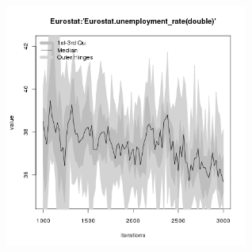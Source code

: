 \begin{figure}[ht!]
\begin{minipage}{17cm}
\includegraphics[width=8cm]{./energy_shock/png/duration_240/intensity_0.01/frequency_20/Eurostat-unemployment_rate.png}
\end{minipage}
\end{figure}

